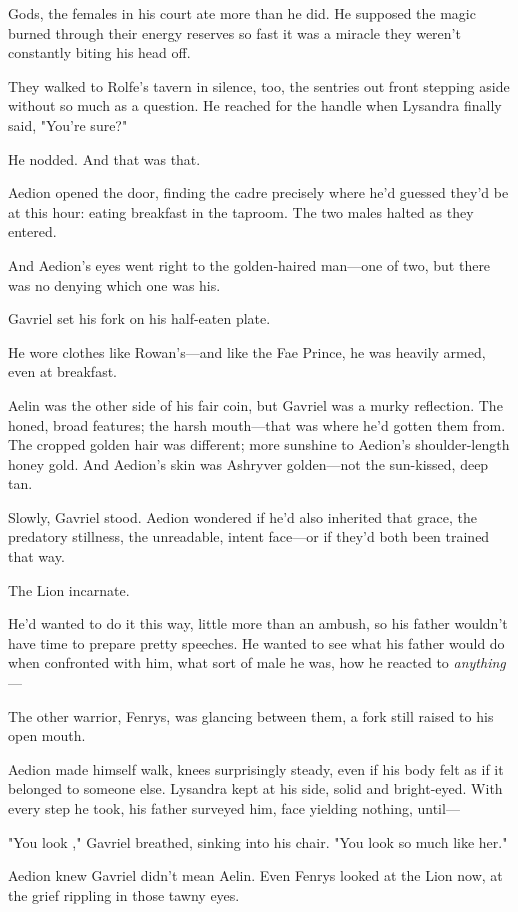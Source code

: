 Gods, the females in his court ate more than he did. He supposed the magic burned through their energy reserves so fast it was a miracle they weren't constantly biting his head off.

They walked to Rolfe's tavern in silence, too, the sentries out front stepping aside without so much as a question. He reached for the handle when Lysandra finally said, "You're sure?"

He nodded. And that was that.

Aedion opened the door, finding the cadre precisely where he'd guessed they'd be at this hour: eating breakfast in the taproom. The two males halted as they entered.

And Aedion's eyes went right to the golden-haired man---one of two, but
 there was no denying which one was  his.

Gavriel set his fork on his half-eaten plate.

He wore clothes like Rowan's---and like the Fae Prince, he was heavily armed, even at breakfast.

Aelin was the other side of his fair coin, but Gavriel was a murky reflection. The honed, broad features; the harsh mouth---that was where he'd gotten them from. The cropped golden hair was different; more sunshine to Aedion's shoulder-length honey gold. And Aedion's skin was Ashryver golden---not the sun-kissed, deep tan.

Slowly, Gavriel stood. Aedion wondered if he'd also inherited that grace, the predatory stillness, the unreadable, intent face---or if they'd both been trained that way.

The Lion incarnate.

He'd wanted to do it this way, little more than an ambush, so his father wouldn't have time to prepare pretty speeches. He wanted to see what his father would do when confronted with him, what sort of male he was, how he reacted to \emph{anything}---

The other warrior, Fenrys, was glancing between them, a fork still raised to his open mouth.

Aedion made himself walk, knees surprisingly steady, even if his body felt as if it belonged to someone else. Lysandra kept at his side, solid and bright-eyed. With every step he took, his father surveyed him, face yielding nothing, until---

"You look  ," Gavriel breathed, sinking into his chair. "You look so much like her."

Aedion knew Gavriel didn't mean Aelin. Even Fenrys looked at the Lion now, at the grief rippling in those tawny eyes.

